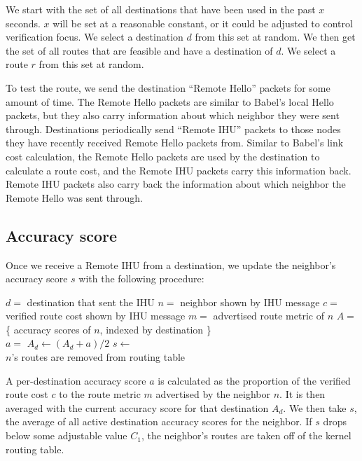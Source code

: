 \documentclass[11pt]{article}
\begin{document}
We start with the set of all destinations that have been used in the past $x$ seconds. $x$ will be set at a reasonable constant, or it could be adjusted to control verification focus. We select a destination $d$ from this set at random. We then get the set of all routes that are feasible and have a destination of $d$. We select a route $r$ from this set at random.

To test the route, we send the destination ``Remote Hello'' packets for some amount of time. The Remote Hello packets are similar to Babel’s local Hello packets, but they also carry information about which neighbor they were sent through. Destinations periodically send ``Remote IHU'' packets to those nodes they have recently received Remote Hello packets from. Similar to Babel’s link cost calculation, the Remote Hello packets are used by the destination to calculate a route cost, and the Remote IHU packets carry this information back. Remote IHU packets also carry back the information about which neighbor the Remote Hello was sent through.

\subsection{Accuracy score}
\label{sec:accuracy}
Once we receive a Remote IHU from a destination, we update the neighbor’s accuracy score $s$ with the following procedure:

\noindent
\begin{minipage}[c]{\textwidth}
\vspace{\abovedisplayskip}
\begin{algorithmic}
\State $d=$ destination that sent the IHU
\State $n=$ neighbor shown by IHU message
\State $c=$ verified route cost shown by IHU message
\State $m=$ advertised route metric of $n$
\State $A=$ \{ accuracy scores of $n$, indexed by destination \}\\
\State $a=$ 
\State $A_d\gets (A_d+a)/2$
\State $s\gets$ \\
\State $n$'s routes are removed from routing table
\EndIf
\end{algorithmic}
\vspace{\belowdisplayskip}
\end{minipage}

A per-destination accuracy score $a$ is calculated as the proportion of the verified route cost $c$ to the route metric $m$ advertised by the neighbor $n$. It is then averaged with the current accuracy score for that destination $A_d$. We then take $s$, the average of all active destination accuracy scores for the neighbor. If $s$ drops below some adjustable value $C_1$, the neighbor’s routes are taken off of the kernel routing table.
\end{document}
